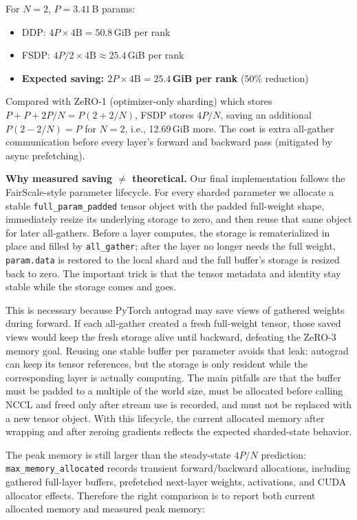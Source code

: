 \documentclass[11pt]{article}
\begin{document}
For $N = 2$, $P = 3.41$\,B params:
\begin{itemize}
  \item DDP: $4P \times 4\text{B} = 50.8$\,GiB per rank
  \item FSDP: $4P/2 \times 4\text{B} \approx 25.4$\,GiB per rank
  \item \textbf{Expected saving: $2P \times 4\text{B} = 25.4$\,GiB per rank} ($50\%$ reduction)
\end{itemize}

Compared with ZeRO-1 (optimizer-only sharding) which stores
$P + P + 2P/N = P(2 + 2/N)$, FSDP stores $4P/N$, saving an additional
$P(2 - 2/N) = P$ for $N = 2$, i.e., 12.69\,GiB more.
The cost is extra all-gather communication before every layer's
forward and backward pass (mitigated by async prefetching).

\textbf{Why measured saving $\neq$ theoretical.}
Our final implementation follows the FairScale-style parameter lifecycle.
For every sharded parameter we allocate a stable
\texttt{full\_param\_padded} tensor object with the padded full-weight shape,
immediately resize its underlying storage to zero, and then reuse that same
object for later all-gathers.  Before a layer computes, the storage is
rematerialized in place and filled by \texttt{all\_gather}; after the layer no
longer needs the full weight, \texttt{param.data} is restored to the local
shard and the full buffer's storage is resized back to zero.  The important
trick is that the tensor metadata and identity stay stable while the storage
comes and goes.

This is necessary because PyTorch autograd may save views of gathered weights
during forward.  If each all-gather created a fresh full-weight tensor, those
saved views would keep the fresh storage alive until backward, defeating the
ZeRO-3 memory goal.  Reusing one stable buffer per parameter avoids that leak:
autograd can keep its tensor references, but the storage is only resident while
the corresponding layer is actually computing.  The main pitfalls are that the
buffer must be padded to a multiple of the world size, must be allocated before
calling NCCL and freed only after stream use is recorded, and must not be
replaced with a new tensor object.  With this lifecycle, the current allocated
memory after wrapping and after zeroing gradients reflects the expected
sharded-state behavior.

The peak memory is still larger than the steady-state $4P/N$ prediction:
\texttt{max\_memory\_allocated} records transient forward/backward allocations,
including gathered full-layer buffers, prefetched next-layer weights,
activations, and CUDA allocator effects.  Therefore the right comparison is
to report both current allocated memory and measured peak memory:
\end{document}
